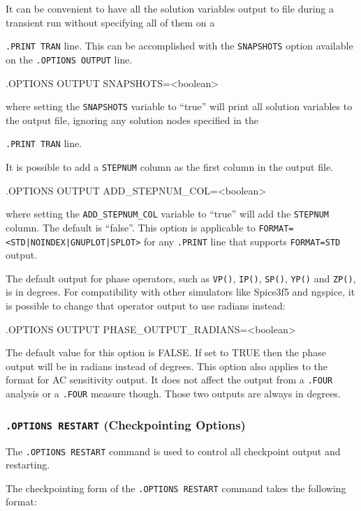 It can be convenient to have all the solution variables output to file during a
transient run without specifying all of them on a {\texttt{.PRINT TRAN} line.  
This can be accomplished with the \texttt{SNAPSHOTS} option available on the
\texttt{.OPTIONS OUTPUT} line.
\begin{vquote}
.OPTIONS OUTPUT SNAPSHOTS=<boolean>
\end{vquote}
where setting the \texttt{SNAPSHOTS} variable to ``true'' will print all solution variables
to the output file, ignoring any solution nodes specified in the {\texttt{.PRINT TRAN} line.

It is possible to add a \texttt{STEPNUM} column as the first column in the output file.
\begin{vquote}
.OPTIONS OUTPUT ADD\_STEPNUM\_COL=<boolean>
\end{vquote}
where setting the \texttt{ADD\_STEPNUM\_COL} variable to ``true'' will add the
\texttt{STEPNUM} column.  The default is ``false''. This option is applicable to
\texttt{FORMAT=<STD|NOINDEX|GNUPLOT|SPLOT>} for any \texttt{.PRINT} line that
supports \texttt{FORMAT=STD} output.

The default \Xyce{} output for phase operators, such as \texttt{VP()}, \texttt{IP()},
\texttt{SP()}, \texttt{YP()} and \texttt{ZP()}, is in degrees.  For compatibility with
other simulators like Spice3f5 and ngspice, it is possible to change that operator
output to use radians instead:
\begin{vquote}
.OPTIONS OUTPUT PHASE\_OUTPUT\_RADIANS=<boolean>
\end{vquote}
The default value for this option is FALSE.  If set to TRUE then the phase output
will be in radians instead of degrees.  This option also applies to the format
for AC sensitivity output.  It does not affect the output from a \texttt{.FOUR}
analysis or a \texttt{.FOUR} measure though.  Those two outputs are always in degrees.

\subsubsection{\texttt{.OPTIONS RESTART} (Checkpointing Options)}

The   \verb+.OPTIONS RESTART+ command is
used to control all  checkpoint output and restarting.

The checkpointing form of the \texttt{.OPTIONS RESTART} command takes the following format:

}}
